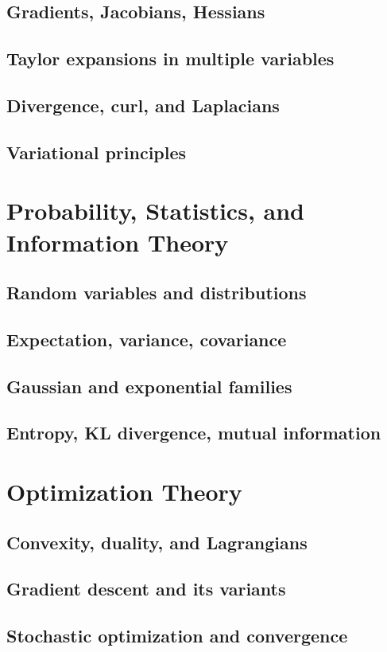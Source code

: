 \section{Gradients, Jacobians, Hessians}
\section{Taylor expansions in multiple variables}
\section{Divergence, curl, and Laplacians}
\section{Variational principles}

\chapter{Probability, Statistics, and Information Theory}
\section{Random variables and distributions}
\section{Expectation, variance, covariance}
\section{Gaussian and exponential families}
\section{Entropy, KL divergence, mutual information}

\chapter{Optimization Theory}
\section{Convexity, duality, and Lagrangians}
\section{Gradient descent and its variants}
\section{Stochastic optimization and convergence}

